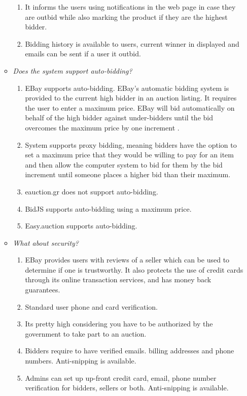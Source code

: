 \documentclass[letterpaper,twocolumn,10pt]{article}
\begin{document}
\begin{itemize}
\begin{itemize}
\begin{enumerate}
    \item It informs the users using notifications in the web page in case they are outbid while also marking the product if they are the highest bidder.
    \item Bidding history is available to users, current winner in displayed and emails can be sent if a user it outbid.
    \end{enumerate} 
\item \emph{Does the system support auto-bidding?}
    \begin{enumerate}
    \item EBay supports auto-bidding. EBay's automatic bidding system is provided to the current high bidder in an auction listing. It requires the user to enter a maximum price. EBay will bid automatically on behalf of the high bidder against under-bidders until the bid overcomes the maximum price by one increment . 
    \item System supports proxy bidding, meaning bidders have the option to set a maximum price that they would be willing to pay for an item and then allow the computer system to bid for them by the bid increment until someone places a higher bid than their maximum.
    \item eauction.gr does not support auto-bidding.
    \item BidJS supports auto-bidding using a maximum price.
    \item Easy.auction supports auto-bidding.
    \end{enumerate} 
\item \emph{What about security?}
    \begin{enumerate}
    \item EBay provides users with reviews of a seller which can be used to determine if one is trustworthy. It also protects the use of credit cards through its online transaction services, and has money back guarantees.
    \item Standard user phone and card verification.
    \item Its pretty high considering you have to be authorized by the government to take part to an auction.
    \item Bidders require to have verified emails. billing addresses and phone numbers. Anti-snipping is available.
    \item Admins can set up  up-front credit card, email, phone number verification for bidders, sellers or both. Anti-snipping is available.
    \end{enumerate}    

\end{itemize}
\end{itemize}
\end{document}
